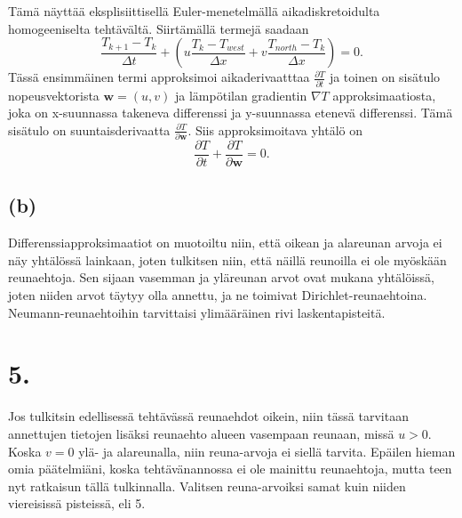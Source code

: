 \documentclass{article}
\begin{document}
Tämä näyttää eksplisiittisellä Euler-menetelmällä aikadiskretoidulta
homogeeniselta tehtävältä. Siirtämällä termejä saadaan
\[
  \frac{T_{k+1} - T_k}{\Delta t} + (u\frac{T_k - T_{west}}{\Delta x} + v\frac{T_{north} - T_k}{\Delta x}) = 0.
\]
Tässä ensimmäinen termi approksimoi aikaderivaatttaa $\frac{\partial T}{\partial t}$
ja toinen on sisätulo nopeusvektorista $\mathbf{w} = (u,v)$ ja lämpötilan
gradientin $\nabla T$ approksimaatiosta, joka on x-suunnassa takeneva
differenssi ja y-suunnassa etenevä differenssi.
Tämä sisätulo on suuntaisderivaatta $\frac{\partial T}{\partial \mathbf{w}}$.
Siis approksimoitava yhtälö on
\[
  \frac{\partial T}{\partial t} + \frac{\partial T}{\partial \mathbf{w}} = 0.
\]

\subsection*{(b)}

Differenssiapproksimaatiot on muotoiltu niin, että oikean ja alareunan arvoja
ei näy yhtälössä lain\-kaan, joten tulkitsen niin, että näillä reunoilla ei ole
myöskään reunaehtoja. Sen sijaan vasemman ja yläreunan arvot ovat mukana yhtälöissä,
joten niiden arvot täytyy olla annettu, ja ne toimivat Dirichlet-reunaehtoina.
Neumann-reunaehtoihin tarvittaisi ylimääräinen rivi laskentapisteitä.

\newpage
\section*{5.}

Jos tulkitsin edellisessä tehtävässä reunaehdot oikein, niin tässä tarvitaan
annettujen tietojen lisäksi reunaehto alueen vasempaan reunaan, missä $u > 0$.
Koska $v = 0$ ylä- ja alareunalla, niin reuna-arvoja ei siellä tarvita.
Epäilen hieman omia päätelmiäni, koska tehtävänannossa ei ole mainittu
reunaehtoja, mutta teen nyt ratkaisun tällä tulkinnalla. Valitsen reuna-arvoiksi
samat kuin niiden viereisissä pisteissä, eli 5.
\end{document}
